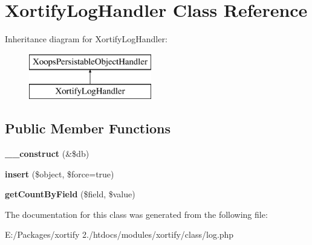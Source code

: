 \hypertarget{class_xortify_log_handler}{\section{Xortify\-Log\-Handler Class Reference}
\label{class_xortify_log_handler}
}
Inheritance diagram for Xortify\-Log\-Handler\-:\begin{figure}[H]
\begin{center}
\leavevmode
\includegraphics[height=2.000000cm]{class_xortify_log_handler}
\end{center}
\end{figure}
\subsection*{Public Member Functions}
\begin{DoxyCompactItemize}
\item 
\hypertarget{class_xortify_log_handler_a962bc72933e07248ad41490401f47c0b}{{\bfseries \-\_\-\-\_\-construct} (\&\$db)}\label{class_xortify_log_handler_a962bc72933e07248ad41490401f47c0b}

\item 
\hypertarget{class_xortify_log_handler_a57dfad4e6e30923dae4a467f1d5beae6}{{\bfseries insert} (\$object, \$force=true)}\label{class_xortify_log_handler_a57dfad4e6e30923dae4a467f1d5beae6}

\item 
\hypertarget{class_xortify_log_handler_aebccef05e4ab63395e09852d18a13d20}{{\bfseries get\-Count\-By\-Field} (\$field, \$value)}\label{class_xortify_log_handler_aebccef05e4ab63395e09852d18a13d20}

\end{DoxyCompactItemize}


The documentation for this class was generated from the following file\-:\begin{DoxyCompactItemize}
\item 
E\-:/\-Packages/xortify 2./htdocs/modules/xortify/class/log.\-php\end{DoxyCompactItemize}
